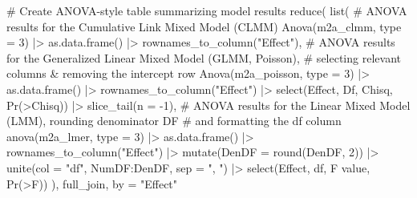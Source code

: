 \documentclass[
  bookmarksnumbered]{article}
\newenvironment{Shaded}{\begin{snugshade}}{\end{snugshade}}
\newcommand{\AttributeTok}[1]{\textcolor[rgb]{0.80,0.80,0.80}{#1}}
\newcommand{\CommentTok}[1]{\textcolor[rgb]{0.50,0.62,0.50}{#1}}
\newcommand{\DecValTok}[1]{\textcolor[rgb]{0.86,0.86,0.80}{#1}}
\newcommand{\FunctionTok}[1]{\textcolor[rgb]{0.94,0.94,0.56}{#1}}
\newcommand{\NormalTok}[1]{\textcolor[rgb]{0.80,0.80,0.80}{#1}}
\newcommand{\SpecialCharTok}[1]{\textcolor[rgb]{0.86,0.64,0.64}{#1}}
\newcommand{\StringTok}[1]{\textcolor[rgb]{0.80,0.58,0.58}{#1}}
\begin{document}
\begin{Shaded}
\begin{Highlighting}[]
\CommentTok{\# Create ANOVA{-}style table summarizing model results}
\FunctionTok{reduce}\NormalTok{(}
  \FunctionTok{list}\NormalTok{(}
    \CommentTok{\# ANOVA results for the Cumulative Link Mixed Model (CLMM)}
    \FunctionTok{Anova}\NormalTok{(m2a\_clmm, }\AttributeTok{type =} \DecValTok{3}\NormalTok{) }\SpecialCharTok{|\textgreater{}}
      \FunctionTok{as.data.frame}\NormalTok{() }\SpecialCharTok{|\textgreater{}}
      \FunctionTok{rownames\_to\_column}\NormalTok{(}\StringTok{"Effect"}\NormalTok{),}
    \CommentTok{\# ANOVA results for the Generalized Linear Mixed Model (GLMM, Poisson),}
    \CommentTok{\# selecting relevant columns \& removing the intercept row}
    \FunctionTok{Anova}\NormalTok{(m2a\_poisson, }\AttributeTok{type =} \DecValTok{3}\NormalTok{) }\SpecialCharTok{|\textgreater{}}
      \FunctionTok{as.data.frame}\NormalTok{() }\SpecialCharTok{|\textgreater{}}
      \FunctionTok{rownames\_to\_column}\NormalTok{(}\StringTok{"Effect"}\NormalTok{) }\SpecialCharTok{|\textgreater{}}
      \FunctionTok{select}\NormalTok{(Effect, Df, Chisq, }\StringTok{\textasciigrave{}}\AttributeTok{Pr(\textgreater{}Chisq)}\StringTok{\textasciigrave{}}\NormalTok{) }\SpecialCharTok{|\textgreater{}}
      \FunctionTok{slice\_tail}\NormalTok{(}\AttributeTok{n =} \SpecialCharTok{{-}}\DecValTok{1}\NormalTok{),}
    \CommentTok{\# ANOVA results for the Linear Mixed Model (LMM), rounding denominator DF}
    \CommentTok{\# and formatting the df column}
    \FunctionTok{anova}\NormalTok{(m2a\_lmer, }\AttributeTok{type =} \DecValTok{3}\NormalTok{) }\SpecialCharTok{|\textgreater{}}
      \FunctionTok{as.data.frame}\NormalTok{() }\SpecialCharTok{|\textgreater{}}
      \FunctionTok{rownames\_to\_column}\NormalTok{(}\StringTok{"Effect"}\NormalTok{) }\SpecialCharTok{|\textgreater{}}
      \FunctionTok{mutate}\NormalTok{(}\AttributeTok{DenDF =} \FunctionTok{round}\NormalTok{(DenDF, }\DecValTok{2}\NormalTok{)) }\SpecialCharTok{|\textgreater{}}
      \FunctionTok{unite}\NormalTok{(}\AttributeTok{col =} \StringTok{"df"}\NormalTok{, NumDF}\SpecialCharTok{:}\NormalTok{DenDF, }\AttributeTok{sep =} \StringTok{", "}\NormalTok{) }\SpecialCharTok{|\textgreater{}}
      \FunctionTok{select}\NormalTok{(Effect, df, }\StringTok{\textasciigrave{}}\AttributeTok{F value}\StringTok{\textasciigrave{}}\NormalTok{, }\StringTok{\textasciigrave{}}\AttributeTok{Pr(\textgreater{}F)}\StringTok{\textasciigrave{}}\NormalTok{)}
\NormalTok{  ),}
\NormalTok{  full\_join,}
  \AttributeTok{by =} \StringTok{"Effect"}

\end{Highlighting}
\end{Shaded}
\end{document}
